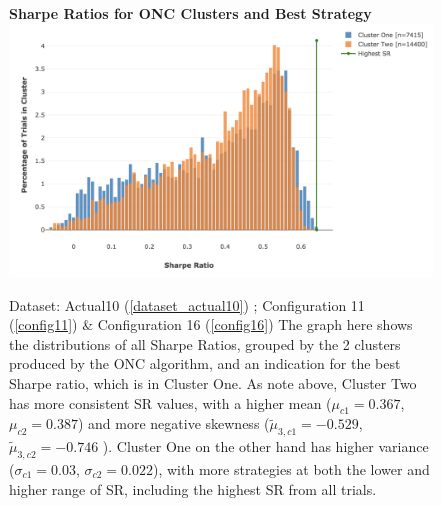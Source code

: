\documentclass[a4paper,11pt,oneside]{article}
\theoremstyle{plain}
\theoremstyle{definition}
\begin{document}
	\begin{figure}[H]
		\centering
		\textbf{Sharpe Ratios for ONC Clusters and Best Strategy}
		\includegraphics[scale=0.4]{images/results/dsr/cluster_distributions.png} 
		\caption[Sharpe Ratios for ONC Clusters and Best Strategy]{Dataset: Actual10 (\ref{dataset_actual10}) ; Configuration 11 (\ref{config11}) \&  Configuration 16 (\ref{config16}) 
			 \newline The graph here shows the distributions of all Sharpe Ratios, grouped by the 2 clusters produced by the ONC algorithm, and an indication for the best Sharpe ratio, which is in Cluster One. As note above, Cluster Two has more consistent SR values, with a higher mean ($\mu_{c1} = 0.367$, $\mu_{c2} = 0.387$) and more negative skewness ($\tilde{\mu}_{3,c1} = -0.529$, $\tilde{\mu}_{3,c2} = -0.746$ ). Cluster One on the other hand has higher variance ($\sigma_{c1} = 0.03$, $\sigma_{c2} = 0.022$), with more strategies at both the lower and higher range of SR, including the highest SR from all trials.}
		\label{figure-dsr_clusters}
	\end{figure}
\end{document}
